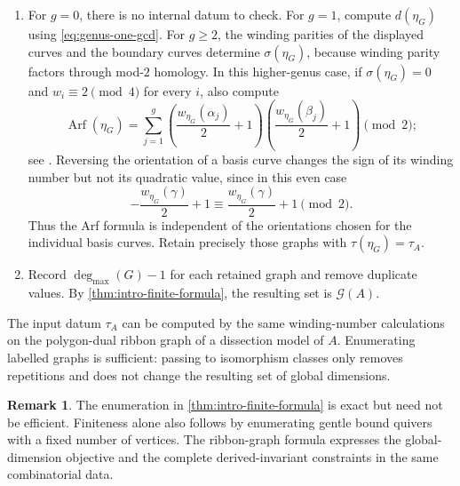 \documentclass[11pt]{amsart}
\theoremstyle{definition}
\theoremstyle{plain}
\theoremstyle{definition}
\theoremstyle{definition}
\newtheorem{remark}[remark]{Remark}
\newcommand{\degmax}{\deg_{\max}}
\newcommand{\GSpec}{\mathcal G}
\newcommand{\Arf}{\operatorname{Arf}}
\begin{document}
\begin{enumerate}[label=\textup{(\arabic*)},leftmargin=2.6em]
\item
For $g=0$, there is no internal datum to check.  For $g=1$, compute
$d(\eta_G)$ using \eqref{eq:genus-one-gcd}.
For $g\geq2$, the winding parities of the displayed curves and
the boundary curves determine $\sigma(\eta_G)$, because winding
parity factors through mod-$2$ homology.  In this higher-genus
case, if $\sigma(\eta_G)=0$ and $w_i\equiv2\pmod4$ for every $i$,
also compute
\[
 \Arf(\eta_G)=\sum_{j=1}^g
 \left(\frac{w_{\eta_G}(\alpha_j)}2+1\right)
 \left(\frac{w_{\eta_G}(\beta_j)}2+1\right)\pmod2;
\]
see \cite[Lemma~7.5 and Theorem~7.4]{AmiotPlamondonSchroll}.
Reversing the orientation of a basis curve changes the sign
of its winding number but not its quadratic value, since in
this even case
\[
  -\frac{w_{\eta_G}(\gamma)}2+1
  \equiv
  \frac{w_{\eta_G}(\gamma)}2+1
  \pmod2.
\]
Thus the Arf formula is independent of the orientations chosen
for the individual basis curves. Retain precisely those graphs with $\tau(\eta_G)=\tau_A$.

\item
Record $\degmax(G)-1$ for each retained graph and remove duplicate
values.  By \cref{thm:intro-finite-formula}, the resulting set is
$\GSpec(A)$.
\end{enumerate}
The input datum $\tau_A$ can be computed by the same
winding-number calculations on the polygon-dual ribbon graph
of a dissection model of $A$.
Enumerating labelled graphs is sufficient: passing to
isomorphism classes only removes repetitions and does not
change the resulting set of global dimensions.

\begin{remark}
\label{rem:finite-not-efficient}
The enumeration in \cref{thm:intro-finite-formula} is exact but
need not be efficient.  Finiteness alone also follows by enumerating
gentle bound quivers with a fixed number of vertices.  The ribbon-graph
formula expresses the global-dimension objective and the complete
derived-invariant constraints in the same combinatorial data.
\end{remark}
\end{document}
